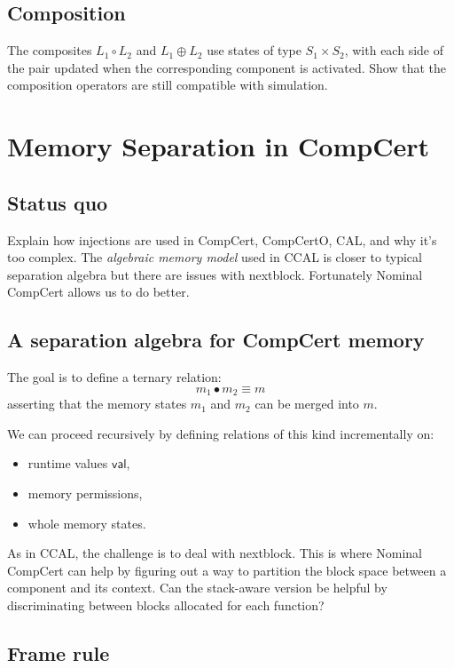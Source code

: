 \documentclass[acmsmall,screen,review,anonymous]{acmart}
\begin{document}
\subsection{Composition}

The composites $L_1 \circ L_2$ and $L_1 \oplus L_2$
use states of type $S_1 \times S_2$,
with each side of the pair updated when the corresponding component
is activated.
Show that the composition operators are
still compatible with simulation.

\section{Memory Separation in CompCert}

\subsection{Status quo}

Explain how injections are used in CompCert, CompCertO, CAL,
and why it's too complex.
The \emph{algebraic memory model} used in CCAL
is closer to typical separation algebra
but there are issues with nextblock.
Fortunately Nominal CompCert allows us to
do better.

\subsection{A separation algebra for CompCert memory}

The goal is to define a ternary relation:
\[
    m_1 \bullet m_2 \equiv m
\]
asserting that the memory states $m_1$ and $m_2$
can be merged into $m$.

We can proceed recursively by defining
relations of this kind incrementally on:
\begin{itemize}
  \item runtime values $\mathsf{val}$,
  \item memory permissions,
  \item whole memory states.
\end{itemize}

As in CCAL,
the challenge is to deal with nextblock.
This is where Nominal CompCert can help
by figuring out a way to partition the block space
between a component and its context.
Can the stack-aware version be helpful
by discriminating between blocks allocated
for each function?

\subsection{Frame rule}
\end{document}
